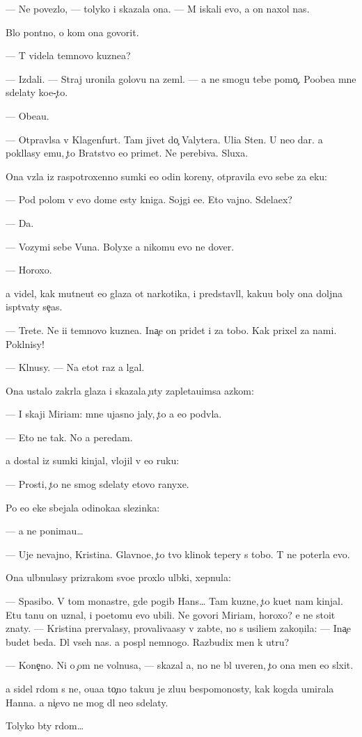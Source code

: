 \documentclass[10pt]{book}
\begin{document}
— Ne povezlo, — tolyko i skazala ona. — M{\yi} iskali {\y}evo, a on naxol nas.

B{\yi}lo pon{\ia}tno, o kom ona govorit.

— T{\yi} videla temnovo kuzne{\q}a?

— Izdali. — Straj uronila golovu na zeml{\iu}. — {\Y}a ne smogu tebe pomo{\c}. Poobe{\x}a{\y} mne sdelaty ko{\y}e-{\c}to.

— Obe{\x}a{\y}u.

— Otpravl{\ia}{\y}sa v Klagenfurt. Tam jivet do{\c} Valytera. Uli{\q}a Sten{\yi}. U ne{\y}o dar. {\Y}a pokl{\ia}lasy {\y}emu, {\c}to Bratstvo {\y}e{\y}o primet. Ne perebiva{\y}. Sluxa{\y}.

Ona vz{\ia}la iz raspotroxenno{\y} sumki {\y}e{\x}o odin koreny, otpravila {\y}evo sebe za {\x}eku:

— Pod polom v {\y}evo dome {\y}esty kniga. Sojgi {\y}e{\y}e. Eto vajno. Sdela{\y}ex?

— Da.

— Vozymi sebe V{\y}una. Bolyxe {\y}a nikomu {\y}evo ne dover{\iu}.

— Horoxo.

{\Y}a videl, kak mutne{\y}ut {\y}e{\y}o glaza ot narkotika, i predstavl{\ia}l, kaku{\y}u boly ona doljna isp{\yi}t{\yi}vaty se{\y}{\c}as.

— Tret{\y}e. Ne i{\x}i temnovo kuzne{\q}a. Ina{\c}e on pridet i za tobo{\y}. Kak prixel za nami. Pokl{\ia}nisy!

— Kl{\ia}nusy. — Na etot raz {\y}a lgal.

Ona ustalo zakr{\yi}la glaza i skazala {\c}uty zapleta{\y}u{\x}imsa {\y}az{\yi}kom:

— I skaji Miriam: mne ujasno jaly, {\c}to {\y}a {\y}e{\y}o podv{\e}la.

— Eto ne tak. No {\y}a peredam.

{\Y}a dostal iz sumki kinjal, vlojil v {\y}e{\y}o ruku:

— Prosti, {\c}to ne smog sdelaty etovo ranyxe.

Po {\y}e{\y}o {\x}eke sbejala odinoka{\y}a slezinka:

— {\Y}a ne ponima{\y}u…

— Uje nevajno, Kristina. Glavno{\y}e, {\c}to tvo{\y} klinok tepery s tobo{\y}. T{\yi} ne poter{\ia}la {\y}evo.

Ona ul{\yi}bnulasy prizrakom svo{\y}e{\y} proxlo{\y} ul{\yi}bki, xepnula:

— Spasibo. V tom monast{\yi}re, gde pogib Hans… Tam kuzne{\q}, {\c}to ku{\y}et nam kinjal{\yi}. Etu ta{\y}nu on uznal, i poetomu {\y}evo ubili. Ne govori Miriam, horoxo? {\Y}e{\y} ne sto{\y}it znaty. — Kristina prervalasy, provaliva{\y}asy v zab{\yi}t{\y}e, no s usili{\y}em zakon{\c}ila: — Ina{\c}e budet beda. Dl{\ia} vseh nas. {\Y}a pospl{\iu} nemnogo. Razbudix men{\ia} k utru?

— Kone{\c}no. Ni o {\c}om ne volnu{\y}sa, — skazal {\y}a, no ne b{\yi}l uveren, {\c}to ona men{\ia} {\y}e{\x}o sl{\yi}xit.

{\Y}a sidel r{\ia}dom s ne{\y}, o{\x}u{\x}a{\y}a to{\c}no taku{\y}u je zlu{\y}u bespomo{\x}nosty, kak kogda umirala Hanna. {\Y}a ni{\c}evo ne mog dl{\ia} ne{\y}o sdelaty.

Tolyko b{\yi}ty r{\ia}dom…
\end{document}
